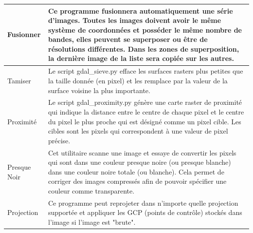 {\begin{longtable}{|p{3cm}|p{13cm}|}
\hline Fusionner & Ce programme fusionnera automatiquement une série d'images. Toutes les images doivent avoir le même système de coordonnées et posséder le même nombre de bandes, elles peuvent se superposer ou être de résolutions différentes. Dans les zones de superposition, la dernière image de la liste sera copiée sur les autres.\\
\hline Tamiser & Le script gdal\_sieve.py efface les surfaces rasters plus petites que la taille donnée (en pixel) et les remplace par la valeur de la surface voisine la plus importante.\\
\hline Proximité & Le script gdal\_proximity.py génère une carte raster de proximité qui indique la distance entre le centre de chaque pixel et le centre du pixel le plus proche qui est désigné comme un pixel cible. Les cibles sont les pixels qui correspondent à une valeur de pixel précise.\\
\hline Presque Noir & Cet utilitaire scanne une image et essaye de convertir les pixels qui sont dans une couleur presque noire (ou presque blanche) dans une couleur noire totale (ou blanche). Cela permet de corriger des images compressés afin de pouvoir spécifier une couleur comme transparente.\\
\hline Projection & Ce programme peut reprojeter dans n'importe quelle projection supportée et appliquer les GCP (points de contrôle) stockés dans l'image si l'image est "brute". \\

\end{longtable}}
